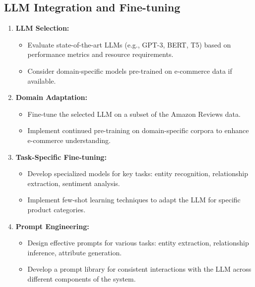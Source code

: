 \documentclass{article}
\begin{document}
\subsection{LLM Integration and Fine-tuning}
\begin{enumerate}
    \item \textbf{LLM Selection:}
    \begin{itemize}
        \item Evaluate state-of-the-art LLMs (e.g., GPT-3, BERT, T5) based on performance metrics and resource requirements.
        \item Consider domain-specific models pre-trained on e-commerce data if available.
    \end{itemize}
    
    \item \textbf{Domain Adaptation:}
    \begin{itemize}
        \item Fine-tune the selected LLM on a subset of the Amazon Reviews data.
        \item Implement continued pre-training on domain-specific corpora to enhance e-commerce understanding.
    \end{itemize}
    
    \item \textbf{Task-Specific Fine-tuning:}
    \begin{itemize}
        \item Develop specialized models for key tasks: entity recognition, relationship extraction, sentiment analysis.
        \item Implement few-shot learning techniques to adapt the LLM for specific product categories.
    \end{itemize}
    
    \item \textbf{Prompt Engineering:}
    \begin{itemize}
        \item Design effective prompts for various tasks: entity extraction, relationship inference, attribute generation.
        \item Develop a prompt library for consistent interactions with the LLM across different components of the system.
    \end{itemize}
\end{enumerate}
\end{document}
